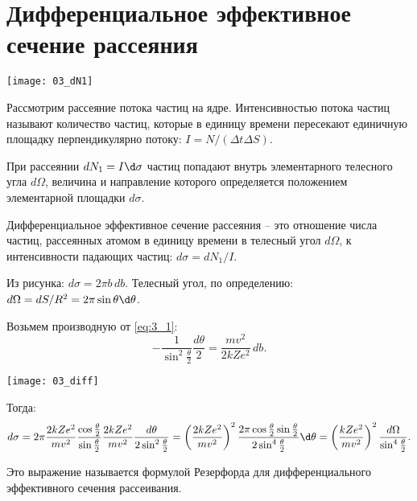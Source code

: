 \section{Дифференциальное эффективное сечение рассеяния}

\begin{minipage}{.35\textwidth}
    \texttt{[image: 03\_dN1]}
\end{minipage}
\begin{minipage}{.6\textwidth}
Рассмотрим рассеяние потока частиц на ядре. Интенсивностью потока частиц
называют количество частиц, которые в единицу времени пересекают единичную
площадку перпендикулярно потоку: \( I = N/(\Delta t\Delta S) \).
 
При рассеянии \( dN_1 = I\d\sigma \) частиц попадают внутрь элементарного
телесного угла \( d\Omega \), величина и направление которого определяется
положением элементарной площадки \( d\sigma \).
\end{minipage}

\begin{minipage}{.55\textwidth}
Дифференциальное эффективное сечение рассеяния -- это отношение числа частиц,
рассеянных атомом в единицу времени в телесный угол \( d\Omega \), к
интенсивности падающих частиц: \( d\sigma = dN_1/I \).

Из рисунка: \( d\sigma = 2\pi b\,db \). Телесный угол, по определению:
\( d\Omega = dS/R^2 = 2\pi\sin\theta\d\theta \).

Возьмем производную от \eqref{eq:3_1}:
\[
    -\frac{1}{\sin^2\frac{\theta}{2}}\frac{d\theta}{2} = \frac{mv^2}{2kZe^2}\,db.
\]
\end{minipage}
\begin{minipage}{.4\textwidth}
    \texttt{[image: 03\_diff]}
\end{minipage}
Тогда:
\[
    d\sigma = 2\pi\frac{2kZe^2}{mv^2}\frac{\cos\frac{\theta}{2}}{\sin\frac
    {\theta}{2}}\frac{2kZe^2}{mv^2}\frac{d\theta}{2\sin^2\frac{\theta}{2}} =
    \left( \frac{2kZe^2}{mv^2} \right)^2 \frac{2\pi\cos\frac{\theta}{2}\sin
    \frac{\theta}{2}}{2\sin^4\frac{\theta}{2}}\d\theta = \left( \frac{kZe^2}
    {mv^2} \right)^2 \frac{d\Omega}{\sin^4\frac{\theta}{2}}.
\]

Это выражение называется формулой Резерфорда для дифференциального эффективного
сечения рассеивания.

\newpage
